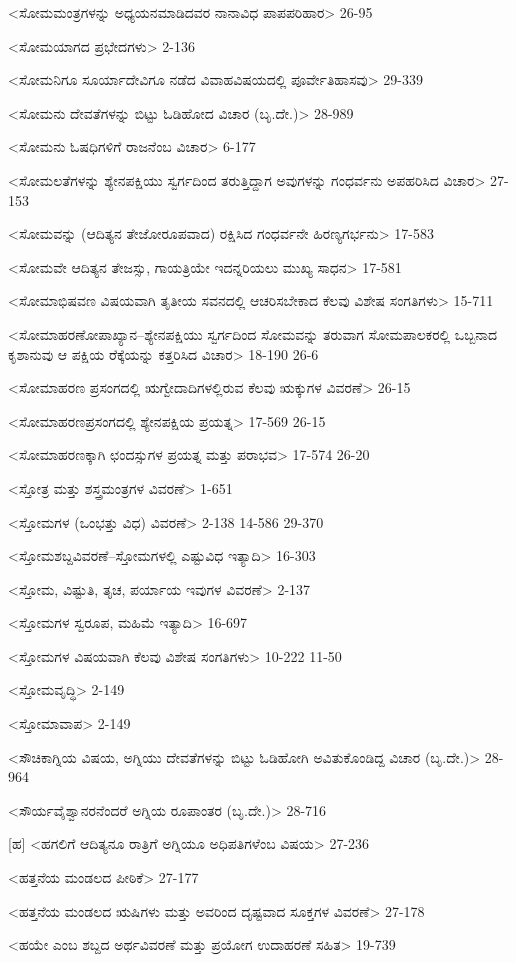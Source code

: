<ಸೋಮಮಂತ್ರಗಳನ್ನು ಅಧ್ಯಯನಮಾಡಿದವರ ನಾನಾವಿಧ ಪಾಪಪರಿಹಾರ>
26-95

<ಸೋಮಯಾಗದ ಪ್ರಭೇದಗಳು>
2-136

<ಸೋಮನಿಗೂ ಸೂರ್ಯಾದೇವಿಗೂ ನಡೆದ ವಿವಾಹವಿಷಯದಲ್ಲಿ ಪೂರ್ವೇತಿಹಾಸವು>
29-339

<ಸೋಮನು ದೇವತೆಗಳನ್ನು ಬಿಟ್ಟು ಓಡಿಹೋದ ವಿಚಾರ (ಬೃ.ದೇ.)>
28-989

<ಸೋಮನು ಓಷಧಿಗಳಿಗೆ ರಾಜನೆಂಬ ವಿಚಾರ>
6-177

<ಸೋಮಲತೆಗಳನ್ನು ಶ್ಯೇನಪಕ್ಷಿಯು ಸ್ವರ್ಗದಿಂದ ತರುತ್ತಿದ್ದಾಗ ಅವುಗಳನ್ನು ಗಂಧರ್ವನು ಅಪಹರಿಸಿದ ವಿಚಾರ>
27-153

<ಸೋಮವನ್ನು (ಆದಿತ್ಯನ ತೇಜೋರೂಪವಾದ) ರಕ್ಷಿಸಿದ ಗಂಧರ್ವನೇ ಹಿರಣ್ಯಗರ್ಭನು>
17-583

<ಸೋಮವೇ ಆದಿತ್ಯನ ತೇಜಸ್ಸು, ಗಾಯತ್ರಿಯೇ ಇದನ್ನರಿಯಲು ಮುಖ್ಯ ಸಾಧನ>
17-581

<ಸೋಮಾಭಿಷವಣ ವಿಷಯವಾಗಿ ತೃತೀಯ ಸವನದಲ್ಲಿ ಆಚರಿಸಬೇಕಾದ ಕೆಲವು ವಿಶೇಷ ಸಂಗತಿಗಳು>
15-711

<ಸೋಮಾಹರಣೋಪಾಖ್ಯಾನ–ಶ್ಯೇನಪಕ್ಷಿಯು ಸ್ವರ್ಗದಿಂದ ಸೋಮವನ್ನು ತರುವಾಗ ಸೋಮಪಾಲಕರಲ್ಲಿ ಒಬ್ಬನಾದ ಕೃಶಾನುವು ಆ ಪಕ್ಷಿಯ ರೆಕ್ಕೆಯನ್ನು ಕತ್ತರಿಸಿದ ವಿಚಾರ>
18-190
26-6

<ಸೋಮಾಹರಣ ಪ್ರಸಂಗದಲ್ಲಿ ಋಗ್ವೇದಾದಿಗಳಲ್ಲಿರುವ ಕೆಲವು ಋಕ್ಕುಗಳ ವಿವರಣೆ>
26-15

<ಸೋಮಾಹರಣಪ್ರಸಂಗದಲ್ಲಿ ಶ್ಯೇನಪಕ್ಷಿಯ ಪ್ರಯತ್ನ>
17-569
26-15

<ಸೋಮಾಹರಣಕ್ಕಾಗಿ ಛಂದಸ್ಸುಗಳ ಪ್ರಯತ್ನ ಮತ್ತು ಪರಾಭವ>
17-574 
26-20

<ಸ್ತೋತ್ರ ಮತ್ತು ಶಸ್ತ್ರಮಂತ್ರಗಳ ವಿವರಣೆ>
1-651

<ಸ್ತೋಮಗಳ (ಒಂಭತ್ತು ವಿಧ) ವಿವರಣೆ>
2-138
14-586
29-370

<ಸ್ತೋಮಶಬ್ದವಿವರಣೆ–ಸ್ತೋಮಗಳಲ್ಲಿ ಎಷ್ಟುವಿಧ ಇತ್ಯಾದಿ>
16-303

<ಸ್ತೋಮ, ವಿಷ್ಟುತಿ, ತೃಚ, ಪರ್ಯಾಯ ಇವುಗಳ ವಿವರಣೆ>
2-137

<ಸ್ತೋಮಗಳ ಸ್ವರೂಪ, ಮಹಿಮೆ ಇತ್ಯಾದಿ>
16-697

<ಸ್ತೋಮಗಳ ವಿಷಯವಾಗಿ ಕೆಲವು ವಿಶೇಷ ಸಂಗತಿಗಳು>
10-222
11-50

<ಸ್ತೋಮವೃದ್ಧಿ>
2-149

<ಸ್ತೋಮಾವಾಪ>
2-149

<ಸೌಚಿಕಾಗ್ನಿಯ ವಿಷಯ, ಅಗ್ನಿಯು ದೇವತೆಗಳನ್ನು ಬಿಟ್ಟು ಓಡಿಹೋಗಿ ಅವಿತುಕೊಂಡಿದ್ದ ವಿಚಾರ (ಬೃ.ದೇ.)>
28-964

<ಸೌರ್ಯವೈಶ್ವಾನರನೆಂದರೆ ಅಗ್ನಿಯ ರೂಪಾಂತರ (ಬೃ.ದೇ.)>
28-716

[ಹ]
<ಹಗಲಿಗೆ ಆದಿತ್ಯನೂ ರಾತ್ರಿಗೆ ಅಗ್ನಿಯೂ ಅಧಿಪತಿಗಳೆಂಬ ವಿಷಯ>
27-236

<ಹತ್ತನೆಯ ಮಂಡಲದ ಪೀಠಿಕೆ>
27-177

<ಹತ್ತನೆಯ ಮಂಡಲದ ಋಷಿಗಳು ಮತ್ತು ಅವರಿಂದ ದೃಷ್ಟವಾದ ಸೂಕ್ತಗಳ ವಿವರಣೆ>
27-178

<ಹಯೇ ಎಂಬ ಶಬ್ದದ ಅರ್ಥವಿವರಣೆ ಮತ್ತು ಪ್ರಯೋಗ ಉದಾಹರಣೆ ಸಹಿತ>
19-739

